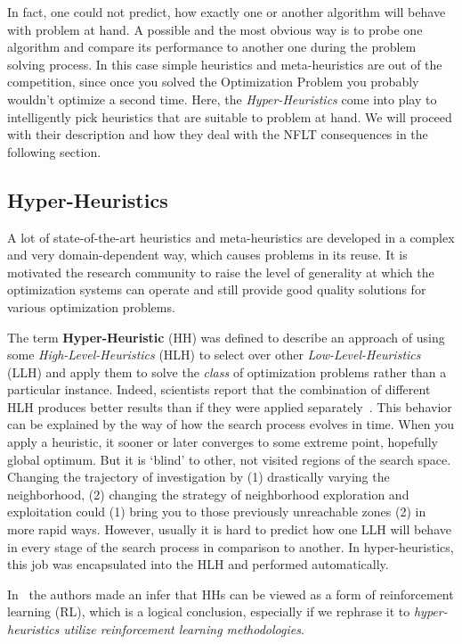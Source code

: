 In fact, one could not predict, how exactly one or another algorithm will behave with problem at hand. A possible and the most obvious way is to probe one algorithm and compare its performance to another one during the problem solving process. In this case simple heuristics and meta-heuristics are out of the competition, since once you solved the Optimization Problem you probably wouldn't optimize a second time.
Here, the \emph{Hyper-Heuristics} come into play to intelligently pick heuristics that are suitable to problem at hand. We will proceed with their description and how they deal with the NFLT consequences in the following section.


\subsection{Hyper-Heuristics}\label{bg: hh}
A lot of state-of-the-art heuristics and meta-heuristics are developed in a complex and very domain-dependent way, which causes problems in its reuse. It is motivated the research community to raise the level of generality at which the optimization systems can operate and still provide good quality solutions for various optimization problems. 

The term \textbf{Hyper-Heuristic} (HH) was defined to describe an approach of using some \textit{High-Level-Heuristics} (HLH) to select over other \textit{Low-Level-Heuristics} (LLH) and apply them to solve the \textit{class} of optimization problems rather than a particular instance. Indeed, scientists report that the combination of different HLH produces better results than if they were applied separately~\cite{drake2019recent}.
This behavior can be explained by the way of how the search process evolves in time. When you apply a heuristic, it sooner or later converges to some extreme point, hopefully global optimum. But it is `blind' to other, not visited regions of the search space. Changing the trajectory of investigation by (1) drastically varying the neighborhood, (2) changing the strategy of neighborhood exploration and exploitation could (1) bring you to those previously unreachable zones (2) in more rapid ways. However, usually it is hard to predict how one LLH will behave in every stage of the search process in comparison to another. In hyper-heuristics, this job was encapsulated into the HLH and performed automatically. 

In~\cite{moriarty1999evolutionary} the authors made an infer that HHs can be viewed as a form of reinforcement learning (RL), which is a logical conclusion, especially if we rephrase it to \textit{hyper-heuristics utilize reinforcement learning methodologies}.

